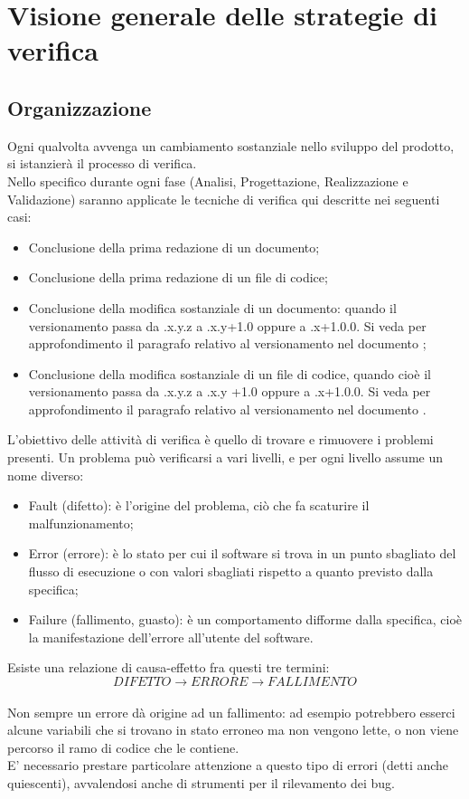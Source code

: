 \section{Visione generale delle strategie di verifica}{
\subsection{Organizzazione}{
	Ogni qualvolta avvenga un cambiamento sostanziale nello sviluppo del prodotto, si istanzierà il processo di verifica. \\
	Nello specifico durante ogni fase (Analisi, Progettazione, Realizzazione e Validazione) saranno applicate le tecniche di verifica qui descritte nei seguenti casi:
	\begin{itemize}
		\item Conclusione della prima redazione di un documento;
		\item Conclusione della prima redazione di un file di codice;
		\item Conclusione della modifica sostanziale di un documento: quando il versionamento passa da .x.y.z a .x.y+1.0 oppure a .x+1.0.0. Si veda per approfondimento il paragrafo relativo al versionamento nel documento \href{run:../../Esterni/\fNormeDiProgetto}{\fEscapeNormeDiProgetto};
		\item Conclusione della modifica sostanziale di un file di codice, quando cioè il versionamento passa da .x.y.z a .x.y +1.0 oppure a .x+1.0.0. Si veda per approfondimento il paragrafo relativo al versionamento nel documento \href{run:../../Esterni/\fNormeDiProgetto}{\fEscapeNormeDiProgetto}.
	\end{itemize}
	L'obiettivo delle attività di verifica è quello di trovare e rimuovere i problemi presenti. Un problema può verificarsi a vari livelli, e per ogni livello assume un nome diverso:
	\begin{itemize}
		\item Fault (difetto): è l'origine del problema, ciò che fa scaturire il malfunzionamento;
		\item Error (errore): è lo stato per cui il software si trova in un punto sbagliato del flusso di esecuzione o con valori sbagliati rispetto a quanto previsto dalla specifica;
		\item Failure (fallimento, guasto): è un comportamento difforme dalla specifica, cioè la manifestazione dell'errore all'utente del software.
	\end{itemize}
	Esiste una relazione di causa-effetto fra questi tre termini:\\
	\[DIFETTO\longrightarrow ERRORE\longrightarrow FALLIMENTO\]\\
	Non sempre un errore dà origine ad un fallimento: ad esempio potrebbero esserci alcune variabili che si trovano in stato erroneo ma non vengono lette, o non viene percorso il ramo di codice che le contiene.\\
	E' necessario prestare particolare attenzione a questo tipo di errori (detti anche quiescenti), avvalendosi anche di strumenti per il rilevamento dei bug.
}
}
